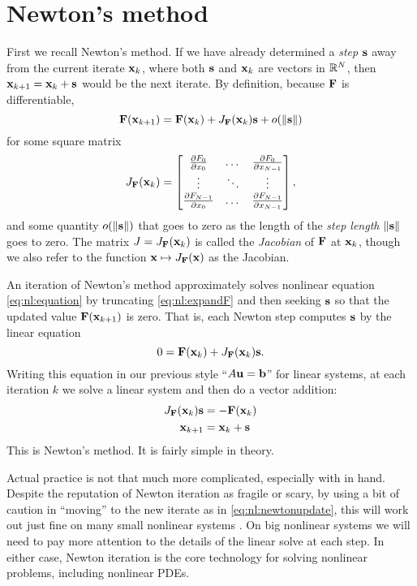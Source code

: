 \section{Newton's method}

First we recall Newton's method.  If we have already determined a \emph{step} $\mathbf{s}$ away from the current iterate $\mathbf{x}_k$, where both $\mathbf{s}$ and $\mathbf{x}_k$ are vectors in $\mathbb{R}^N$, then $\mathbf{x}_{k+1} = \mathbf{x}_k + \mathbf{s}$ would be the next iterate.  By definition, because $\mathbf{F}$ is differentiable,
\begin{equation}
    \mathbf{F}(\mathbf{x}_{k+1}) = \mathbf{F}(\mathbf{x}_k) + J_{\mathbf{F}}(\mathbf{x}_k) \mathbf{s} + o(\|\mathbf{s}\|)  \label{eq:nl:expandF}
\end{equation}
for some square matrix
\begin{equation}
J_{\mathbf{F}}(\mathbf{x}_k) = \begin{bmatrix}
    \frac{\partial F_0}{\partial x_0} & \dots & \frac{\partial F_0}{\partial x_{N-1}} \\
    \vdots & \ddots & \vdots \\
    \frac{\partial F_{N-1}}{\partial x_0} & \dots & \frac{\partial F_{N-1}}{\partial x_{N-1}}  \end{bmatrix},  \label{eq:nl:jacdefn}
\end{equation}
and some quantity $o(\|\mathbf{s}\|)$ that goes to zero as the length of the \emph{step length} $\|\mathbf{s}\|$ goes to zero.  The matrix $J = J_{\mathbf{F}}(\mathbf{x}_k)$ is called the \emph{Jacobian} of $\mathbf{F}$ at $\mathbf{x}_k$, though we also refer to the function $\mathbf{x} \mapsto J_{\mathbf{F}}(\mathbf{x})$ as the Jacobian.

An iteration of Newton's method approximately solves nonlinear equation \eqref{eq:nl:equation} by truncating \eqref{eq:nl:expandF} and then seeking $\mathbf{s}$ so that the updated value $\mathbf{F}(\mathbf{x}_{k+1})$ is zero.  That is, each Newton step computes $\mathbf{s}$ by the linear equation
\begin{equation}
    0 = \mathbf{F}(\mathbf{x}_k) + J_{\mathbf{F}}(\mathbf{x}_k) \mathbf{s}.
\end{equation}
Writing this equation in our previous style ``$A\mathbf{u}=\mathbf{b}$'' for linear systems, at each iteration $k$ we solve a linear system and then do a vector addition:
\begin{align}
    J_{\mathbf{F}}(\mathbf{x}_k) \mathbf{s} &= - \mathbf{F}(\mathbf{x}_k)  \label{eq:nl:newtoneq}  \\
    \mathbf{x}_{k+1} &= \mathbf{x}_k + \mathbf{s}  \label{eq:nl:newtonupdate}
\end{align}
This is Newton's method.  It is fairly simple in theory.

Actual practice is not that much more complicated, especially with \PETSc in hand.  Despite the reputation of Newton iteration as fragile or scary, by using a bit of caution in ``moving'' to the new iterate as in \eqref{eq:nl:newtonupdate}, this will work out just fine on many small nonlinear systems \citep{Kelley2003}.  On big nonlinear systems we will need to pay more attention to the details of the linear solve at each step.  In either case, Newton iteration is the core technology for solving nonlinear problems, including nonlinear PDEs.

